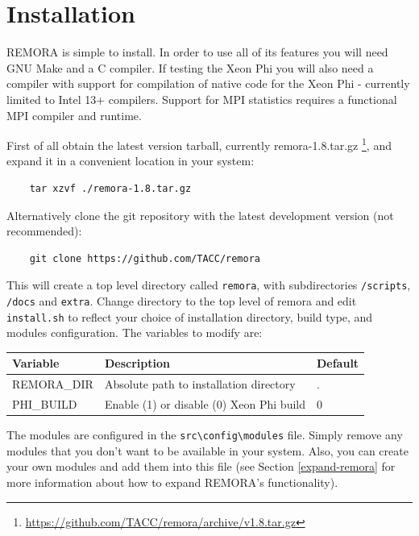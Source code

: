 \documentclass[10pt,a4paper]{report}
\begin{document}
\tableofcontents

\chapter{Installation}
REMORA is simple to install. In order to use all of its features you will need GNU Make and a C compiler. If testing the Xeon Phi you will also need a compiler with support for compilation of native code for the Xeon Phi - currently limited to Intel 13+ compilers. Support for MPI statistics requires a functional MPI compiler and runtime.

First of all obtain the latest version tarball, currently remora-1.8.tar.gz \footnote{\href{https://github.com/TACC/remora/archive/v1.8.tar.gz}{https://github.com/TACC/remora/archive/v1.8.tar.gz}}, and expand it in a convenient location in your system:

\begin{verbatim}
    tar xzvf ./remora-1.8.tar.gz
\end{verbatim}

Alternatively clone the git repository with the latest development version (not recommended):

\begin{verbatim}
    git clone https://github.com/TACC/remora
\end{verbatim}

This will create a top level directory called \verb+remora+, with subdirectories \verb+/scripts+, \verb+/docs+ and \verb+extra+. Change directory to the top level of remora and edit \verb+install.sh+ to reflect your choice of installation directory, build type, and modules configuration. The variables to modify are:

\begin{table}[h]
\centering
\label{tab:env}
\begin{tabular}{|l|l|l|}
\hline
\bf{Variable}	& \bf{Description}                          & \bf{Default}\\\hline
REMORA\_DIR     & Absolute path to installation directory   & . \\\hline
PHI\_BUILD      & Enable (1) or disable (0) Xeon Phi build  & 0 \\\hline
\end{tabular}
\end{table}

The modules are configured in the \verb+src\config\modules+ file. Simply remove any modules that you don't want to be available in your system. Also, you can create your own modules and add them into this file (see Section \ref{expand-remora} for more information about how to expand REMORA's functionality).
\end{document}
